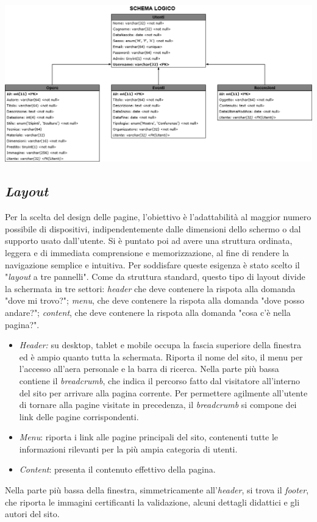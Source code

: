 \begin{center}
	\includegraphics[width=\textwidth]{img/SchemaLogico}
\end{center}

\subsection{\textit{Layout}}
\label{progettazione-layout}
Per la scelta del design delle pagine, l'obiettivo è l'adattabilità al maggior numero possibile di dispositivi, indipendentemente dalle dimensioni dello schermo o dal supporto usato dall'utente. Si è puntato poi ad avere una struttura ordinata, leggera e di immediata comprensione e memorizzazione, al fine di rendere la navigazione semplice e intuitiva.
Per soddisfare queste esigenza è stato scelto il "\textit{layout} a tre pannelli". Come da struttura standard, questo tipo di layout divide la schermata in tre settori: \textit{header} che deve contenere la rispota alla domanda "dove mi trovo?"; \textit{menu}, che deve contenere la rispota alla domanda "dove posso andare?"; \textit{content}, che deve contenere la rispota alla domanda "cosa c'è nella pagina?".
\begin{itemize}
	\item \textit{Header:} su desktop, tablet e mobile occupa la fascia superiore della finestra ed è ampio quanto tutta la schermata. Riporta il nome del sito, il menu per l'accesso all'aera personale e la barra di ricerca. Nella parte più bassa contiene il \textit{breadcrumb}, che indica il percorso fatto dal visitatore all'interno del sito per arrivare alla pagina corrente. Per permettere agilmente all'utente di tornare alla pagine visitate in precedenza, il \textit{breadcrumb} si compone dei link delle pagine corrispondenti. 
	\item \textit{Menu}: riporta i link alle pagine principali del sito, contenenti tutte le informazioni rilevanti per la più ampia categoria di utenti.
	\item \textit{Content}: presenta il contenuto effettivo della pagina.
\end{itemize}
Nella parte più bassa della finestra, simmetricamente all'\textit{header}, si trova il \textit{footer}, che riporta le immagini certificanti la validazione, alcuni dettagli didattici e gli autori del sito. \\\\

